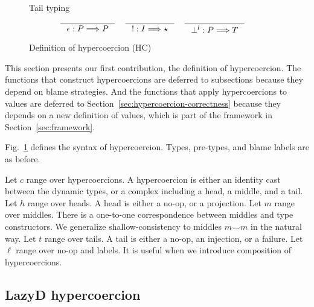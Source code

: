 \documentclass[acmsmall,review,anonymous]{acmart}\settopmatter{printfolios=true,printccs=false,printacmref=false}
\newcommand{\figref}[1]{Fig.~\ref{#1}}
\newcommand{\lazyD}{Lazy\;D}
\newcommand{\TOOdyn}[0]{\star}
\newcommand{\typingHC}[3]{#1 : #2 \Longrightarrow #3}
\begin{document}
\begin{figure}
		Tail typing \fbox{$ \typingHC{t}{P}{T} $}
		\begin{gather*}
		\inference{}{\typingHC{\epsilon}{P}{P}} \quad
		\inference{}{\typingHC{!}{I}{\TOOdyn}} \quad
		\inference{}{\typingHC{\bot^l}{P}{T}} \quad
		\end{gather*}
	
	\caption{Definition of hypercoercion (HC)}
	\label{fig:hypercoercion}
\end{figure}


This section presents our first contribution, the definition of hypercoercion. 
The functions that construct hypercoercions are deferred to subsections because 
they depend on blame strategies.
And the functions that apply hypercoercions to values are deferred to 
Section~\ref{sec:hypercoercion-correctness} because 
they depends on a new definition of values, which is part of the framework in
Section~\ref{sec:framework}.

\figref{fig:hypercoercion} defines the syntax of hypercoercion. Types, 
pre-types, and blame labels are as before.

Let $ c $ range over hypercoercions. A hypercoercion is either 
an identity cast between the dynamic types, or a complex including a head, a 
middle, and a tail. 
Let $ h $ range over heads. A head is either a no-op, or a projection.
Let $ m $ range over middles. There is a one-to-one 
correspondence between middles and type constructors. 
We generalize shallow-consistency to middles $ m \smile m $ in the natural way.
Let $ t $ range over tails. A tail is either a no-op, an injection, or a 
failure. 
Let $ \ell $ range over no-op and labels. It is useful when we introduce 
composition of hypercoercions.

\subsection{\lazyD{} hypercoercion}
\end{document}
